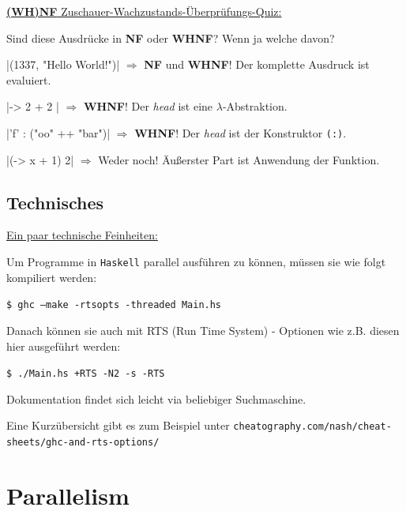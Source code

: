 \documentclass{beamer}
\begin{document}
\begin{frame}[fragile]

\underline{\textbf{(WH)NF} Zuschauer-Wachzustands-Überprüfungs-Quiz:}\smallskip

Sind diese Ausdrücke in \textbf{NF} oder \textbf{WHNF}? Wenn ja welche davon?
\bigskip\pause

|(1337, "Hello World!")|
\pause
$\Rightarrow$ \textbf{NF} und \textbf{WHNF}! Der komplette Ausdruck ist evaluiert.
\pause

|\x -> 2 + 2 |
\pause
$\Rightarrow$ \textbf{WHNF}! Der \emph{head} ist eine $\lambda$-Abstraktion.
\pause

|'f' : ("oo" ++ "bar")|
\pause
$\Rightarrow$ \textbf{WHNF}! Der \emph{head} ist der Konstruktor \texttt{(:)}.
\pause

|(\x -> x + 1) 2|
\pause
$\Rightarrow$ Weder noch! Äußerster Part ist Anwendung der Funktion.

\end{frame}


\subsection{Technisches}

\begin{frame}[fragile]
\underline{Ein paar technische Feinheiten:}\pause\bigskip

Um Programme in \texttt{Haskell} parallel ausführen zu können, müssen sie wie folgt
kompiliert werden:\smallskip

\texttt{\$ ghc --make -rtsopts -threaded Main.hs}
\pause
\bigskip

Danach können sie auch mit RTS (Run Time System) - Optionen wie z.B. diesen hier ausgeführt werden:\smallskip

\texttt{\$ ./Main.hs +RTS -N2 -s -RTS}
\bigskip
\pause

Dokumentation findet sich leicht via beliebiger Suchmaschine.

Eine Kurzübersicht gibt es zum Beispiel unter \texttt{cheatography.com/nash/cheat-sheets/ghc-and-rts-options/}

\end{frame}


\section{Parallelism}
\end{document}
